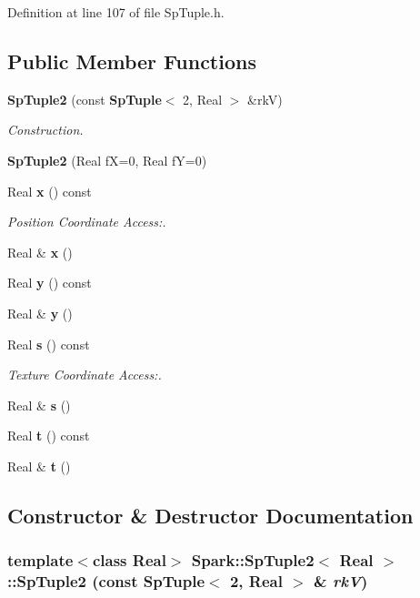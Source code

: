 Definition at line 107 of file Sp\-Tuple.h.\subsection*{Public Member Functions}
\begin{CompactItemize}
\item 
{\bf Sp\-Tuple2} (const {\bf Sp\-Tuple}$<$ 2, Real $>$ \&rk\-V)
\begin{CompactList}\small\item\em Construction. \item\end{CompactList}\item 
{\bf Sp\-Tuple2} (Real f\-X=0, Real f\-Y=0)
\item 
Real {\bf x} () const
\begin{CompactList}\small\item\em Position Coordinate Access:. \item\end{CompactList}\item 
Real \& {\bf x} ()
\item 
Real {\bf y} () const
\item 
Real \& {\bf y} ()
\item 
Real {\bf s} () const
\begin{CompactList}\small\item\em Texture Coordinate Access:. \item\end{CompactList}\item 
Real \& {\bf s} ()
\item 
Real {\bf t} () const
\item 
Real \& {\bf t} ()
\end{CompactItemize}


\subsection{Constructor \& Destructor Documentation}
\subsubsection{\setlength{\rightskip}{0pt plus 5cm}template$<$class Real$>$ {\bf Spark::Sp\-Tuple2}$<$ Real $>$::{\bf Sp\-Tuple2} (const {\bf Sp\-Tuple}$<$ 2, Real $>$ \& {\em rk\-V})\hspace{0.3cm}{\tt  [inline]}}\label{classSpark_1_1SpTuple2_a0}


